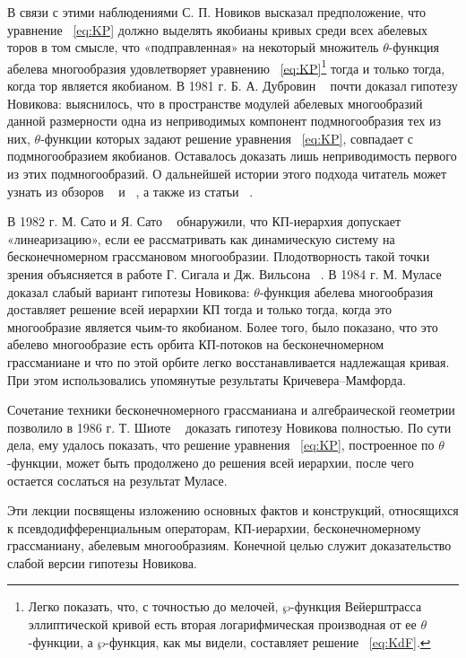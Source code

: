 \documentclass{article}
\theoremstyle{definition}
\theoremstyle{definition} %
\theoremstyle{remark}     %
\theoremstyle{definition}
\theoremstyle{definition}
\theoremstyle{definition}
\theoremstyle{definition}
\theoremstyle{definition}
\theoremstyle{definition}
\theoremstyle{definition}
\theoremstyle{definition}
\begin{document}
В связи с этими наблюдениями С. П. Новиков высказал предположение, что уравнение ~\ref{eq:KP} должно выделять якобианы кривых среди всех абелевых торов в том смысле, что «подправленная» на некоторый множитель \(\theta\)-функция абелева многообразия удовлетворяет уравнению ~\ref{eq:KP}\footnote{Легко показать, что, с точностью до мелочей, \(\wp\)-функция Вейерштрасса эллиптической кривой есть вторая логарифмическая производная от ее \(\theta\)-функции, а \(\wp\)-функция, как мы видели, составляет решение ~\ref{eq:KdF}.} тогда и только тогда, когда тор является якобианом. В 1981 г. Б. А. Дубровин ~\cite{dubrovin1, dubrovin2} почти доказал гипотезу Новикова: выяснилось, что в пространстве модулей абелевых многообразий данной размерности одна из неприводимых компонент подмногообразия тех из них, \(\theta\)-функции которых задают решение уравнения ~\ref{eq:KP}, совпадает с подмногообразием якобианов. Оставалось доказать лишь неприводимость первого из этих подмногообразий. О дальнейшей истории этого подхода читатель может узнать из обзоров ~\cite{boville} и ~\cite{shokurov}, а также из статьи ~\cite{arbarello-concini}.

В 1982 г. М. Сато и Я. Сато ~\cite{sato-sato} обнаружили, что КП-иерархия допускает «линеаризацию», если ее рассматривать как динамическую систему на бесконечномерном грассмановом многообразии. Плодотворность такой точки зрения объясняется в работе Г. Сигала и Дж. Вильсона ~\cite{segal-wilson}. В 1984 г. М. Муласе ~\cite{mulase2} доказал слабый вариант гипотезы Новикова: \(\theta\)-функция абелева многообразия доставляет решение всей иерархии КП тогда и только тогда, когда это многообразие является чьим-то якобианом. Более того, было показано, что это абелево многообразие есть орбита КП-потоков на бесконечномерном грассманиане и что по этой орбите легко восстанавливается надлежащая кривая. При этом использовались упомянутые результаты Кричевера–Мамфорда.

Сочетание техники бесконечномерного грассманиана и алгебраической геометрии позволило в 1986 г. Т. Шиоте ~\cite{shiota} доказать гипотезу Новикова полностью. По сути дела, ему удалось показать, что решение уравнения ~\ref{eq:KP}, построенное по \(\theta\)-функции, может быть продолжено до решения всей иерархии, после чего остается сослаться на результат Муласе.

Эти лекции посвящены изложению основных фактов и конструкций, относящихся к псевдодифференциальным операторам, КП-иерархии, бесконечномерному грассманиану, абелевым многообразиям. Конечной целью служит доказательство слабой версии гипотезы Новикова.
\end{document}
